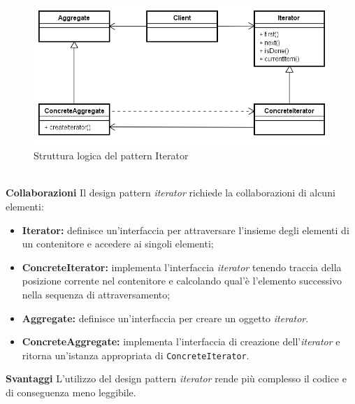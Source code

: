\\
\label{Struttura logica del pattern Iterator}
\begin{figure}
	\centering
	\includegraphics[scale=0.45]{UML/strutturaPattern/Iterator.png}
	\caption{Struttura logica del pattern Iterator}
\end{figure}
\\
\textbf{Collaborazioni}	Il design pattern \textit{iterator} richiede la collaborazioni di alcuni elementi:
	\begin{itemize}
		\item \textbf{Iterator:} definisce un'interfaccia per attraversare l'insieme degli elementi di un contenitore e accedere ai singoli elementi;
		\item \textbf{ConcreteIterator:} implementa l'interfaccia \textit{iterator} tenendo traccia della posizione corrente nel contenitore e calcolando qual'è l'elemento successivo nella sequenza di attraversamento;
		\item \textbf{Aggregate:} definisce un'interfaccia per creare un oggetto \textit{iterator}.
		\item \textbf{ConcreteAggregate:} implementa l'interfaccia di creazione dell'\textit{iterator} e ritorna un'istanza appropriata di \texttt{ConcreteIterator}.
	\end{itemize}
\textbf{Svantaggi}	L'utilizzo del design pattern \textit{iterator} rende più complesso il codice e di conseguenza meno leggibile.


